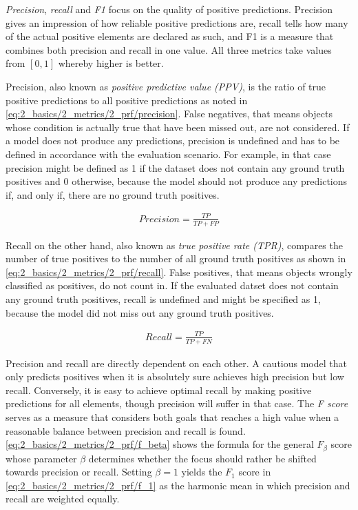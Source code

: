 \emph{Precision}, \emph{recall} and \emph{F1} focus on the quality of positive predictions. Precision gives an impression of how reliable positive predictions are, recall tells how many of the actual positive elements are declared as such, and F1 is a measure that combines both precision and recall in one value. All three metrics take values from $[0, 1]$ whereby higher is better.

Precision, also known as \emph{positive predictive value (PPV)}, is the ratio of true positive predictions to all positive predictions as noted in \autoref{eq:2_basics/2_metrics/2_prf/precision}. False negatives, that means objects whose condition is actually true that have been missed out, are not considered. If a model does not produce any predictions, precision is undefined and has to be defined in accordance with the evaluation scenario. For example, in that case precision might be defined as 1 if the dataset does not contain any ground truth positives and 0 otherwise, because the model should not produce any predictions if, and only if, there are no ground truth positives.

\begin{align}
    Precision = \frac{TP}{TP + FP}
    \label{eq:2_basics/2_metrics/2_prf/precision}
\end{align}

Recall on the other hand, also known as \emph{true positive rate (TPR)}, compares the number of true positives to the number of all ground truth positives as shown in \autoref{eq:2_basics/2_metrics/2_prf/recall}. False positives, that means objects wrongly classified as positives, do not count in. If the evaluated datset does not contain any ground truth positives, recall is undefined and might be specified as 1, because the model did not miss out any ground truth positives.

\begin{align}
    Recall = \frac{TP}{TP + FN}
    \label{eq:2_basics/2_metrics/2_prf/recall}
\end{align}

Precision and recall are directly dependent on each other. A cautious model that only predicts positives when it is absolutely sure achieves high precision but low recall. Conversely, it is easy to achieve optimal recall by making positive predictions for all elements, though precision will suffer in that case. The \emph{F score} serves as a measure that considers both goals that reaches a high value when a reasonable balance between precision and recall is found. \autoref{eq:2_basics/2_metrics/2_prf/f_beta} shows the formula for the general $F_\beta$ score whose parameter $\beta$ determines whether the focus should rather be shifted towards precision or recall. Setting $\beta = 1$ yields the $F_1$ score in \autoref{eq:2_basics/2_metrics/2_prf/f_1} as the harmonic mean in which precision and recall are weighted equally.

